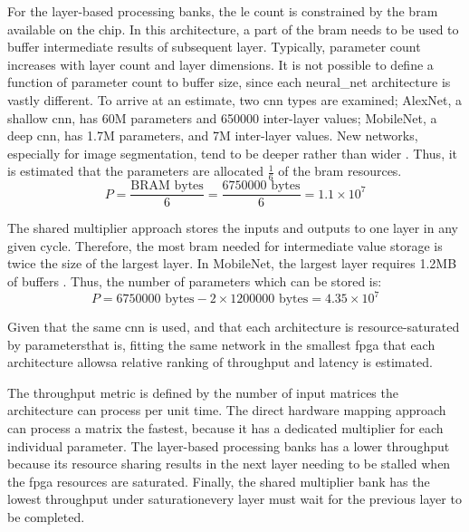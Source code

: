 \documentclass{uw-ece-wkrpt}
\begin{document}
For the layer-based processing banks, the \gls{le} count is constrained by the \gls{bram} available on the chip. In this architecture, a part of the \gls{bram} needs to be used to buffer intermediate results of subsequent layer. Typically, parameter count increases with layer count and layer dimensions. It is not possible to define a function of parameter count to buffer size, since each \gls{neural_net} architecture is vastly different. To arrive at an estimate, two \gls{cnn} types are examined; AlexNet, a shallow \gls{cnn}, has 60M parameters and 650000 inter-layer values; MobileNet, a deep \gls{cnn}, has 1.7M parameters, and 7M inter-layer values. New networks, especially for image segmentation, tend to be deeper rather than wider \cite{Howard2017MobileNets:-Eff}. Thus, it is estimated that the parameters are allocated $\frac{1}{6}$ of the \gls{bram} resources.
\begin{equation}
    P = \frac{\text{BRAM bytes}}{6} = \frac{6750000 \text{ bytes}}{6} = 1.1 \times 10^7
\end{equation}

The shared multiplier approach stores the inputs and outputs to one layer in any given cycle. Therefore, the most \gls{bram} needed for intermediate value storage is twice the size of the largest layer. In MobileNet, the largest layer requires 1.2MB of buffers \cite{Howard2017MobileNets:-Eff}. Thus, the number of parameters which can be stored is:
\begin{equation}
    P = 6750000 \text{ bytes} - 2 \times 1200000 \text{ bytes} = 4.35 \times 10^7
\end{equation}

Given that the same \gls{cnn} is used, and that each architecture is resource-saturated by parameters\textemdash{}that is, fitting the same network in the smallest \gls{fpga} that each architecture allows\textemdash{}a relative ranking of throughput and latency is estimated.

The throughput metric is defined by the number of input matrices the architecture can process per unit time. The direct hardware mapping approach can process a matrix the fastest, because it has a dedicated multiplier for each individual parameter. The layer-based processing banks has a lower throughput because its resource sharing results in the next layer needing to be stalled when the \gls{fpga} resources are saturated. Finally, the shared multiplier bank has the lowest throughput under saturation\textemdash{}every layer must wait for the previous layer to be completed.
\end{document}
